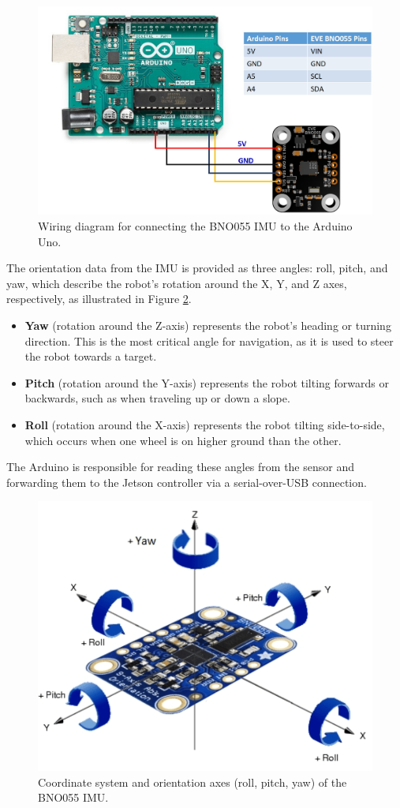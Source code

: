 \begin{figure}[h!]
    \centering
    \includegraphics[width=\linewidth]{figures/arduino-connection.png}
    \caption{Wiring diagram for connecting the BNO055 IMU to the Arduino Uno.}
    \label{fig:imu_connection}
\end{figure}

The orientation data from the IMU is provided as three angles: roll, pitch, and yaw, which describe the robot's rotation around the X, Y, and Z axes, respectively, as illustrated in Figure \ref{fig:imu_axes}.
\begin{itemize}
    \item \textbf{Yaw} (rotation around the Z-axis) represents the robot's heading or turning direction. This is the most critical angle for navigation, as it is used to steer the robot towards a target.
    \item \textbf{Pitch} (rotation around the Y-axis) represents the robot tilting forwards or backwards, such as when traveling up or down a slope.
    \item \textbf{Roll} (rotation around the X-axis) represents the robot tilting side-to-side, which occurs when one wheel is on higher ground than the other.
\end{itemize}
The Arduino is responsible for reading these angles from the sensor and forwarding them to the Jetson controller via a serial-over-USB connection.

\begin{figure}[h!]
    \centering
    \includegraphics[width=0.7\linewidth]{figures/roll.png}
    \caption{Coordinate system and orientation axes (roll, pitch, yaw) of the BNO055 IMU.}
    \label{fig:imu_axes}
\end{figure}

